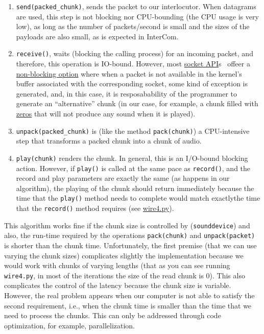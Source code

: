 \begin{enumerate}
\item \verb|send(packed_chunk)|, sends the packet to our
  interlocutor. When datagrams are used, this step is not blocking nor
  CPU-bounding (the CPU usage is very low), as long as the number of
  packets/second is small and the sizes of the payloads are also
  small, as is expected in InterCom.

\item \verb|receive()|, waits (blocking the calling process) for an
  incoming packet, and therefore, this operation is IO-bound. However,
  most \href{https://docs.python.org/3/library/socket.html}{socket
    API}s~\cite{python} offeer a
  \href{https://docs.python.org/3.8/library/socket.html#socket.socket.setblocking}{non-blocking
    option} where when a packet is not available in the kernel's
  buffer associated with the corresponding socket, some kind of
  exception is generated, and, in this case, it is resposabability of
  the programmer to generate an ``alternative'' chunk (in our case,
  for example, a chunk filled with
  \href{https://en.wikipedia.org/wiki/Digital_audio#Overview}{zeros}
  that will not produce any sound when it is played).

\item \verb|unpack(packed_chunk)| is (like the method
  \texttt{pack(chunk)}) a CPU-intensive step that transforms a
  packed chunk into a chunk of audio.

\item \verb|play(chunk)| renders the chunk. In general, this is an
  I/O-bound blocking action. However, if \verb|play()| is called at
  the same pace as \verb|record()|, and the record and play parameters
  are exactly the same (as happens in our algorithm), the playing of
  the chunk should return immediately because the time that the
  \verb|play()| method needs to complete would match exactlythe time
  that the \verb|record()| method requires (see
  \href{https://github.com/Tecnologias-multimedia/InterCom/blob/master/test/sounddevice/wire4.py}{wire4.py}).
\end{enumerate}

This algorithm works fine if the chunk size is controlled by
(\verb|sounddevice|) and also, the run-time required by the operations
\verb|pack(chunk)| and \verb|unpack(packet)| is shorter than the chunk
time. Unfortunately, the first premise (that we can use varying the
chunk sizes) complicates slightly the implementation because we would
work with chunks of varying lengths (that as you can see running
\verb|wire4.py|, in most of the iterations the size of the read chunk
is 0). This also complicates the control of the latency because the
chunk size is variable. However, the real problem appears when our
computer is not able to satisfy the second requirement, i.e., when the
chunk time is smaller than the time that we need to process the
chunks. This can only be addressed through code optimization, for
example, parallelization.

